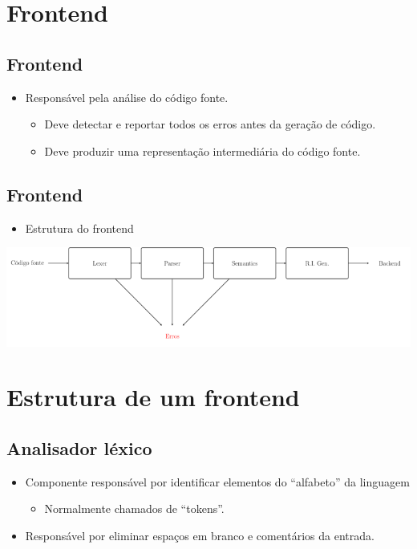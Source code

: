 \documentclass[11pt]{article}
\begin{document}
\section*{Frontend}
\label{sec:orgd1a323d}

\subsection*{Frontend}
\label{sec:orgb1ac79f}

\begin{itemize}
\item Responsável pela análise do código fonte.
\begin{itemize}
\item Deve detectar e reportar todos os erros antes da geração de código.
\item Deve produzir uma representação intermediária do código fonte.
\end{itemize}
\end{itemize}
\subsection*{Frontend}
\label{sec:org7259492}

\begin{itemize}
\item Estrutura do frontend
\end{itemize}

\begin{center}
\includegraphics[width=.9\linewidth]{./imgs/image4.png}
\end{center}
\section*{Estrutura de um frontend}
\label{sec:org16b7564}

\subsection*{Analisador léxico}
\label{sec:org90a4282}

\begin{itemize}
\item Componente responsável por identificar elementos do ``alfabeto'' da linguagem
\begin{itemize}
\item Normalmente chamados de ``tokens''.
\end{itemize}

\item Responsável por eliminar espaços em branco e comentários da entrada.
\end{itemize}
\end{document}
